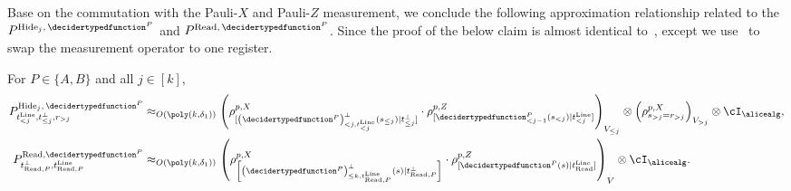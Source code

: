 Base on the commutation with the Pauli-$X$ and Pauli-$Z$ measurement, we conclude the following approximation relationship related to the $P^{\text{Hide}_j, \, \decidertypedfunction^P}$ and $P^{\text{Read}, \, \decidertypedfunction^P}$. Since the proof of the below claim is almost identical to~\cite[Lemma 8.22, Lemma 8.23]{jiMIPRE2022a}, except we use~ to swap the measurement operator to one register.
\begin{claim} \label{claim:structureHideandRead}
	For $P \in \{A,B\}$ and all $j \in [k]$, 
	\begin{align}
		\label{eq:QRHidevariable} P^{\text{Hide}_j, \, \decidertypedfunction^P}_{t^{\text{Line}}_{< j} ,t^{\bot}_{\leq j}, r_{> j}} &\approx_{O(\poly(k, \delta_1))}  \left(\rho^{p,X}_{[\left(\decidertypedfunction^P\right)^{\bot}_{< j, t^{\text{Line}}_{< j}}(s_{\leq j})| t^{\bot}_{\leq j}]} \cdot \rho^{p,Z}_{[\decidertypedfunction^P_{< j-1}(s_{< j})| t_{< j}^{\text{Line}}]}\right)_{V_{\leq j}} \otimes  \left(\rho^{p,X}_{s_{> j} = r_{> j} }\right)_{V_{> j}} \otimes \cI_{\alicealg}, \\
		\label{eq:QRReadvariable}  P^{\text{Read}, \decidertypedfunction^P}_{t_{\text{Read}, P}^{\bot},t_{\text{Read}, P}^{\text{Line}}} &\approx_{O(\poly(k, \delta_1))}  \left(\rho^{p,X}_{\left[\left(\decidertypedfunction^P\right)^{\bot}_{\leq k, t_{\text{Read}, P}^{\text{Line}} }(s)| t_{\text{Read}, P}^{\bot} \right]} \cdot \rho^{p,Z}_{[\decidertypedfunction^P(s)| t_{\text{Read}}^{\text{Line}}]} \right)_{V} \otimes \cI_{\alicealg}. 
	\end{align}
\end{claim}
